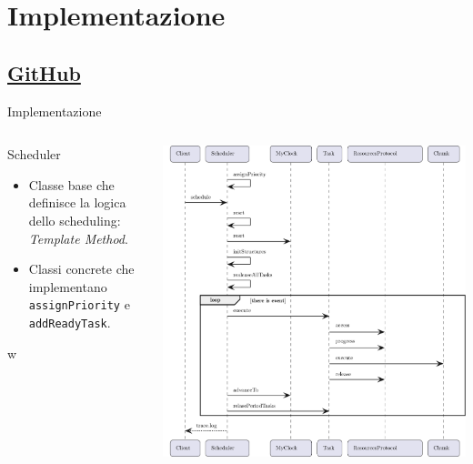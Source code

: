 \section{Implementazione}
\subsection{\href{https://github.com/edoardosarri24/real-time-scheduling-simulator.git}{GitHub}}

\begin{frame}{Implementazione}
    \begin{columns}
        \begin{column}{.4\textwidth}
            \begin{block}{Scheduler}
                \begin{itemize}
                    \item Classe base che definisce la logica dello scheduling: \textit{Template Method}.
                    \item Classi concrete che implementano \texttt{assignPriority} e \texttt{addReadyTask}.
                \end{itemize}w
            \end{block}
        \end{column}
        \begin{column}{.6\textwidth}
            \centering
            \includegraphics[width=\textwidth]{images/3-implementazione/sequence diagram.pdf}
        \end{column}
    \end{columns}
\end{frame}

